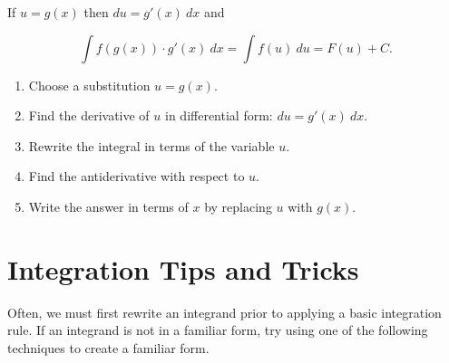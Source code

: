 \documentclass{ximera}
\begin{document}
\begin{procedure}

If $u=g(x)$ then $du=g'(x) \ dx$ and

\[ \int  f(g(x)) \cdot g'(x) \ dx =  \int f(u) \ du =   F(u) + C. \]



\begin{enumerate}
\item Choose a substitution $u=g(x).$

\item Find the derivative of $u$ in differential form: $du=g'(x) \ dx.$

\item Rewrite the integral in terms of the variable $u.$

\item Find the antiderivative with respect to $u.$

\item Write the answer in terms of $x$ by replacing $u$ with
$g(x).$
\end{enumerate}

\end{procedure}


\section*{Integration Tips and Tricks}

Often, we must first rewrite an integrand prior to applying a basic integration rule. If an integrand is not in a
familiar form, try using one of the following techniques to create a familiar form.
\end{document}
